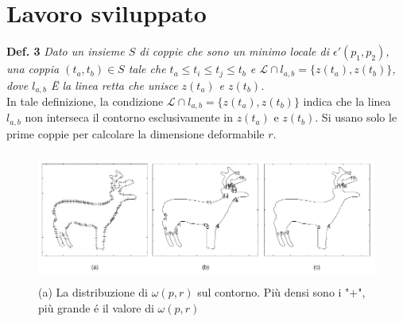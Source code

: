 \chapter{Lavoro sviluppato} 
\label{Cap3}

\textbf{Def. 3} \textit{Dato un insieme $S$ di coppie che sono un minimo locale di $\epsilon'(p_1,p_2)$, una coppia $(t_a,t_b) \in S$ tale che  $t_a \leq t_i \leq t_j \leq t_b$ e $\mathcal{L} \cap l_{a,b} = \lbrace z(t_a),z(t_b)\rbrace$, dove $l_{a,b}$ Ë la linea retta che unisce $z(t_a)$ e $z(t_b)$.}\\
In tale definizione, la condizione $\mathcal{L} \cap l_{a,b} = \lbrace z(t_a),z(t_b)\rbrace$ indica che la linea $l_{a,b}$ non interseca il contorno esclusivamente in $z(t_a)$ e $z(t_b)$. Si usano solo le prime coppie per calcolare la dimensione deformabile $r$.   

\begin{figure}[h!]	
  \caption{ (a) La distribuzione di $\omega(p,r)$ sul contorno. Più densi sono i "+", più grande é il valore di $\omega(p,r)$}
  \label{contour_2}
  \centering
\includegraphics[width=126.48mm, height=42.67mm]{./Figures/contour_flex_deer.png}
\end{figure} 